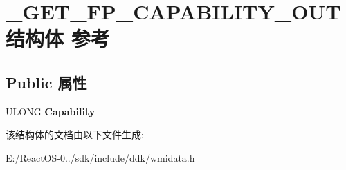 \hypertarget{struct___g_e_t___f_p___c_a_p_a_b_i_l_i_t_y___o_u_t}{}\section{\+\_\+\+G\+E\+T\+\_\+\+F\+P\+\_\+\+C\+A\+P\+A\+B\+I\+L\+I\+T\+Y\+\_\+\+O\+U\+T结构体 参考}
\label{struct___g_e_t___f_p___c_a_p_a_b_i_l_i_t_y___o_u_t}
\subsection*{Public 属性}
\begin{DoxyCompactItemize}
\item 
\mbox{\label{struct___g_e_t___f_p___c_a_p_a_b_i_l_i_t_y___o_u_t_a2c76756c2b0692a5908f3e4210a70002}} 
U\+L\+O\+NG {\bfseries Capability}
\end{DoxyCompactItemize}


该结构体的文档由以下文件生成\+:\begin{DoxyCompactItemize}
\item 
E\+:/\+React\+O\+S-\/0../sdk/include/ddk/wmidata.\+h\end{DoxyCompactItemize}
